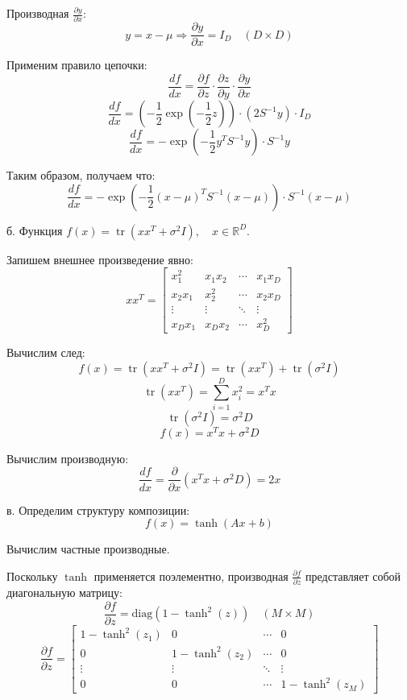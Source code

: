 \documentclass{article}
\begin{document}
Производная \( \frac{\partial y}{\partial x} \):
\[
y = x - \mu \Rightarrow \frac{\partial y}{\partial x} = I_D \quad (D \times D)
\]

Применим правило цепочки:
\[
\frac{df}{dx} = \frac{\partial f}{\partial z} \cdot \frac{\partial z}{\partial y} \cdot \frac{\partial y}{\partial x}
\]
\[
\frac{df}{dx} = \left(-\frac{1}{2} \exp\left(-\frac{1}{2}z\right)\right) \cdot (2 S^{-1} y) \cdot I_D
\]
\[
\frac{df}{dx} = -\exp\left(-\frac{1}{2}y^T S^{-1} y\right) \cdot S^{-1} y
\]

Таким образом, получаем что:
\[
\frac{df}{dx} = -\exp\left(-\frac{1}{2}(x - \mu)^T S^{-1} (x - \mu)\right) \cdot S^{-1} (x - \mu)
\]

\quad

б. Функция \( f(x) = \operatorname{tr}(xx^T + \sigma^2 I), \quad x \in \mathbb{R}^D \).

\quad

Запишем внешнее произведение явно:
\[
x x^T = \begin{bmatrix}
x_1^2 & x_1 x_2 & \cdots & x_1 x_D \\
x_2 x_1 & x_2^2 & \cdots & x_2 x_D \\
\vdots & \vdots & \ddots & \vdots \\
x_D x_1 & x_D x_2 & \cdots & x_D^2
\end{bmatrix}
\]

Вычислим след:
\[
f(x) = \operatorname{tr}(x x^T + \sigma^2 I) = \operatorname{tr}(x x^T) + \operatorname{tr}(\sigma^2 I)
\]
\[
\operatorname{tr}(x x^T) = \sum_{i=1}^D x_i^2 = x^T x
\]
\[
\operatorname{tr}(\sigma^2 I) = \sigma^2 D
\]
\[
f(x) = x^T x + \sigma^2 D
\]

Вычислим производную:
\[
\frac{df}{dx} = \frac{\partial}{\partial x} (x^T x + \sigma^2 D) = 2x
\]

\quad

в. Определим структуру композиции:
\[
f(x) = \tanh(Ax + b)
\]

Вычислим частные производные.

\quad

Поскольку \(\tanh\) применяется поэлементно, производная \( \frac{\partial f}{\partial z} \) представляет собой диагональную матрицу:
\[
\frac{\partial f}{\partial z} = \text{diag}\left(1 - \tanh^2(z)\right) \quad (M \times M)
\]
\[
\frac{\partial f}{\partial z} = \begin{bmatrix}
1 - \tanh^2(z_1) & 0 & \cdots & 0 \\
0 & 1 - \tanh^2(z_2) & \cdots & 0 \\
\vdots & \vdots & \ddots & \vdots \\
0 & 0 & \cdots & 1 - \tanh^2(z_M)
\end{bmatrix}
\]
\end{document}
